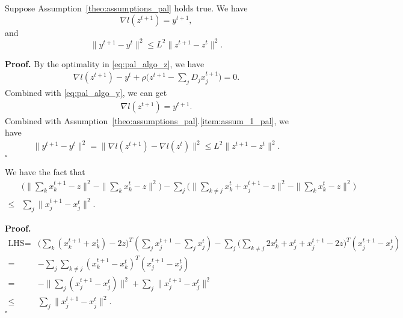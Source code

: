 \begin{lemma}\label{lemma:y_diff_bound}
Suppose Assumption~\ref{theo:assumptions_pal} holds true. We have 
\[
    \nabla l(z^{t+1}) = y^{t+1},
\]
and 
\[
    \|y^{t+1} - y^t\|^2 \le L^2\|z^{t+1} - z^{t}\|^2.
\]
\end{lemma}
{\bf Proof.} By the optimality in \eqref{eq:pal_algo_z}, we have 
\begin{align}
    \nabla l(z^{t+1}) - y^t + \rho\big(z^{t+1} - \sum_j D_j x_j^{t+1}\big) = 0.\nonumber
\end{align}
Combined with \eqref{eq:pal_algo_y}, we can get 
\begin{align}
    \nabla l(z^{t+1}) = y^{t+1}.
\end{align}
Combined with Assumption~\ref{theo:assumptions_pal}.\ref{item:assum_1_pal}, we have
\begin{align}
\|y^{t+1} - y^{t}\|^2 = \|\nabla l(z^{t+1}) - \nabla l(z^{t})\|^2 \le L^2\|z^{t+1} - z^t\|^2.
\end{align}
\hfill$\square$

\begin{lemma}\label{lemma:algebra_1}
    We have the fact that
    \begin{align}
        & \big(\|\sum_k x_k^{t+1} - z\|^2 - \|\sum_k x_k^{t} - z\|^2\big) - \sum_j\big(\|\sum_{k\neq j} x_k^{t} + x_j^{t+1} - z\|^2 - \|\sum_k x_k^{t} - z\|^2\big)\nonumber\\
        \le & \sum_j\|x_j^{t+1} - x_j^{t}\|^2. 
    \end{align}
\end{lemma}
{\bf Proof.} 
\begin{align}
    \text{LHS} = & \big(\sum_k(x_k^{t+1} + x_k^{t}) - 2z\big)^T(\sum_j x_j^{t+1} - \sum_j x_j^t) - \sum_j\big(\sum_{k\neq j}2x_k^t + x_j^t + x_j^{t+1} -2z\big)^T(x_j^{t+1} - x_j^t)\nonumber\\
    = & - \sum_j \sum_{k\neq j}(x_k^{t+1} - x_k^{t})^T(x_j^{t+1} - x_j^t)\nonumber\\
    = & - \|\sum_j (x_j^{t+1} - x_j^{t})\|^2 + \sum_j\|x_j^{t+1} - x_j^{t}\|^2\nonumber\\
    \le & \sum_j\|x_j^{t+1} - x_j^{t}\|^2.\nonumber
\end{align}
\hfill$\square$

